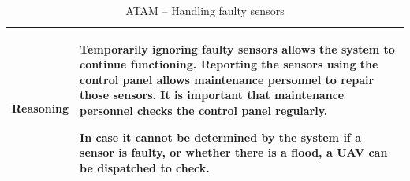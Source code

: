 \begin{table}[H]
\begin{tabular}{L{0.2\textwidth} L{0.6\textwidth}}
		\midrule
		\textbf{Reasoning} 		& Temporarily ignoring faulty sensors allows the system to continue functioning. Reporting the sensors using the control panel allows maintenance personnel to repair those sensors. It is important that maintenance personnel checks the control panel regularly. 
		
		In case it cannot be determined by the system if a sensor is faulty, or whether there is a flood, a UAV can be dispatched to check. \\
								 
	 \bottomrule
	\end{tabular}
	\label{ATAM:faulty-sensors}
	\caption{ATAM -- Handling faulty sensors}
\end{table}

